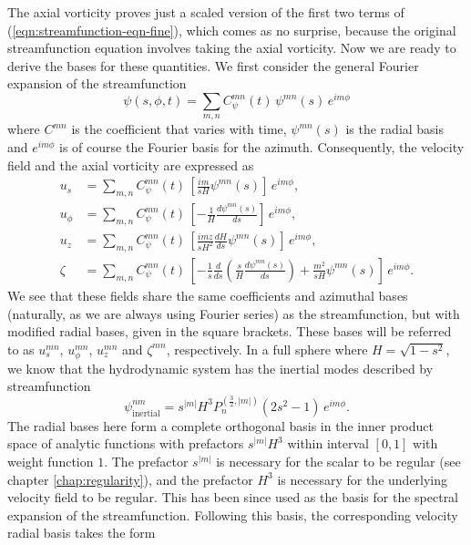 The axial vorticity proves just a scaled version of the first two terms of (\ref{eqn:streamfunction-eqn-fine}), which comes as no surprise, because the original streamfunction equation involves taking the axial vorticity.
Now we are ready to derive the bases for these quantities. We first consider the general Fourier expansion of the streamfunction
\[
    \psi(s, \phi, t) = \sum_{m,n} C_{\psi}^{mn}(t) \, \psi^{mn}(s) \, e^{im\phi}
\]
where $C^{mn}$ is the coefficient that varies with time, $\psi^{mn}(s)$ is the radial basis and $e^{im\phi}$ is of course the Fourier basis for the azimuth.
Consequently, the velocity field and the axial vorticity are expressed as
\begin{equation}
\begin{aligned}
    u_s &= \sum_{m,n} C_\psi^{mn}(t) \, \left[\frac{im}{sH} \psi^{mn}(s)\right] \, e^{im\phi}, \\ 
    u_\phi &= \sum_{m,n} C_\psi^{mn}(t) \, \left[-\frac{1}{H} \frac{d\psi^{mn}(s)}{ds}\right] \, e^{im\phi}, \\
    u_z &= \sum_{m,n} C_\psi^{mn}(t) \, \left[\frac{imz}{sH^2} \frac{dH}{ds} \psi^{mn}(s)\right] \, e^{im\phi}, \\
    \zeta &= \sum_{m,n} C_\psi^{mn}(t) \, \left[-\frac{1}{s}\frac{d}{ds} \left(\frac{s}{H} \frac{d\psi^{mn}(s)}{ds}\right) + \frac{m^2}{sH} \psi^{mn}(s)\right] \, e^{im\phi}.
\end{aligned}
\end{equation}
We see that these fields share the same coefficients and azimuthal bases (naturally, as we are always using Fourier series) as the streamfunction, but with modified radial bases, given in the square brackets. These bases will be referred to as $u_s^{mn}$, $u_\phi^{mn}$, $u_z^{mn}$ and $\zeta^{mn}$, respectively.
In a full sphere where $H=\sqrt{1 - s^2}$, we know that the hydrodynamic system has the inertial modes described by streamfunction
\[
    \psi_\mathrm{inertial}^{nm} = s^{|m|} H^3 P_n^{(\frac{3}{2}, |m|)}(2s^2 - 1) \, e^{im\phi}.
\]
The radial bases here form a complete orthogonal basis in the inner product space of analytic functions with prefactors $s^{|m|} H^3$ within interval $[0, 1]$ with weight function $1$. The prefactor $s^{|m|}$ is necessary for the scalar to be regular (see chapter \ref{chap:regularity}), and the prefactor $H^3$ is necessary for the underlying velocity field to be regular. This has been since used as the basis for the spectral expansion of the streamfunction. Following this basis, the corresponding velocity radial basis takes the form
